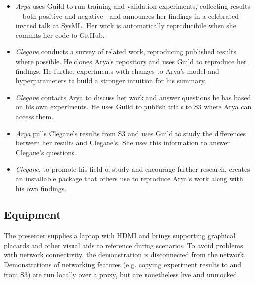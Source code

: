 \documentclass{article}
\begin{document}
\begin{itemize}[topsep=0pt, itemsep=0pt]
\item \emph{Arya} uses Guild to run training and validation
  experiments, collecting results---both positive and negative---and
  announces her findings in a celebrated invited talk at SysML. Her
  work is automatically reproducibile when she commits her code to
  GitHub.

\item \emph{Clegane} conducts a survey of related work, reproducing
  published results where possible. He clones Arya's repository and
  uses Guild to reproduce her findings. He further experiments with
  changes to Arya's model and hyperparameters to build a stronger
  intuition for his summary.

\item \emph{Clegane} contacts Arya to discuss her work and answer
  questions he has based on his own experiments. He uses Guild to
  publish trials to S3 where Arya can access them.

\item \emph{Arya} pulls Clegane's results from S3 and uses Guild to
  study the differences between her results and Clegane's. She uses
  this information to answer Clegane's questions.

\item \emph{Clegane}, to promote his field of study and encourage
  further research, creates an installable package that others use to
  reproduce Arya's work along with his own findings.
\end{itemize}

\subsection{Equipment}

The presenter supplies a laptop with HDMI and brings supporting
graphical placards and other visual aids to reference during
scenarios. To avoid problems with network connectivity, the
demonstration is disconnected from the network. Demonstrations of
networking features (e.g. copying experiment results to and from S3)
are run locally over a proxy, but are nonetheless live and unmocked.



\end{document}
